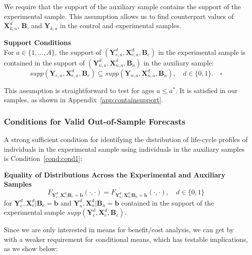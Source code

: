 \noindent  We require that the support of the auxiliary sample contains the support of the experimental sample. This assumption allows us to find counterpart values of $\bm{X}^d_{k,a}$, $\bm{B}$, and $\bm{Y}_{k,a}$ in the control and experimental samples.

\onehalfspacing
\begin{assumption} \label{ass:contain} \textbf{Support Conditions} \\
For $a \in \{ 1, \ldots, A \}$, the support of $\left( \bm{Y}^d_{e,a}, \bm{X}^d_{e,a}, \bm{B}_e \right)$ in the experimental sample is contained in the support of $\left( \bm{Y}^d_{n,a}, \bm{X}^d_{n,a}, \bm{B}_n \right)$ in the auxiliary sample:
\begin{equation}
supp( \bm{Y}_{e,a}, \bm{X}^d_{e,a}, \bm{B}_e ) \subseteq supp( \bm{Y}_{n,a}, \bm{X}^d_{n,a}, \bm{B}_n ), \quad d \in \{0,1\}. \quad \square
\end{equation}
\end{assumption}
\doublespacing
This assumption is straightforward to test for ages $a\leq a^\ast$. It is satisfied in our samples, as shown in Appendix~\ref{app:containsupport}.

\subsubsection{Conditions for Valid Out-of-Sample Forecasts}

\noindent A strong sufficient condition for identifying the distribution of life-cycle profiles of individuals in the experimental sample using individuals in the auxiliary samples is Condition~\ref{cond:cond1}:

\onehalfspacing
\begin{condition} \textbf{Equality of Distributions Across the Experimental and Auxiliary Samples \label{cond:cond1}}
\begin{equation}
F_{\bm{Y}_e^d, \bm{X}_e^d | \bm{B}_e = \bm{b}} \left( \cdot, \cdot \right) = F_{\bm{Y}_n^d, \bm{X}_n^d | \bm{B}_n = \bm{b}} \left( \cdot, \cdot \right), \quad d \in \{0,1\}
\end{equation}
\noindent for $\bm{Y}_e^d, \bm{X}^d_e | \bm{B}_e = \bm{b}$ and $\bm{Y}_n^d, \bm{X}^d_n | \bm{B}_n = \bm{b}$ contained in the support of the experimental sample $supp\left(\bm{Y}^d_{e}, \bm{X}^d_{e}, \bm{B}_{e} \right)$.
\end{condition}
\doublespacing

\noindent  Since we are only interested in means for benefit/cost analysis, we can get by with a weaker requirement for conditional means, which has testable implications, as we show below:

